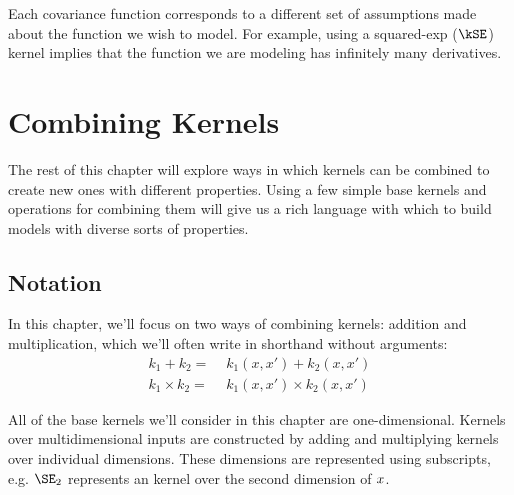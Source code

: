 Each covariance function corresponds to a different set of assumptions made about the function we wish to model.
For example, using a squared-exp ($\kSE$) kernel implies that the function we are modeling has infinitely many derivatives.



\section{Combining Kernels}

The rest of this chapter will explore ways in which kernels can be combined to create new ones with different properties.
Using a few simple base kernels and operations for combining them will give us a rich language with which to build models with diverse sorts of properties.





\subsection{Notation}

In this chapter, we'll focus on two ways of combining kernels: addition and multiplication, which we'll often write in shorthand without arguments:
\begin{align}
k_1 + k_2 =& \,\, k_1(x,x') + k_2(x,x')\\
k_1 \times k_2 =& \,\, k_1(x,x') \times k_2(x,x')
\end{align}


All of the base kernels we'll consider in this chapter are one-dimensional.
Kernels over multidimensional inputs are constructed by adding and multiplying kernels over individual dimensions.
These dimensions are represented using subscripts, e.g. $\SE_2$ represents an \kSE{} kernel over the second dimension of $x$.

